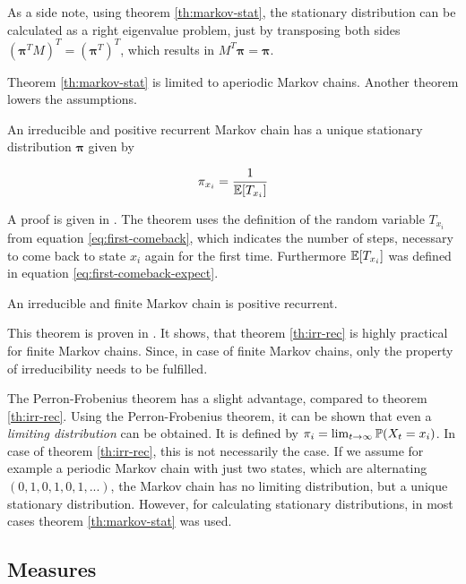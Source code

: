 As a side note, using theorem \ref{th:markov-stat}, the stationary distribution can be calculated as a right eigenvalue problem, just by transposing both sides $(\bm\pi^T M)^T = (\bm\pi^T)^T$, which results in $M^T \bm\pi = \bm\pi$.

Theorem \ref{th:markov-stat} is limited to aperiodic Markov chains. Another theorem lowers the assumptions.

\begin{theorem}
\label{th:irr-rec}
An irreducible and positive recurrent Markov chain has a unique stationary distribution $\bm\pi$ given by

\begin{equation}
\pi_{x_i} = \frac{1}{\mathbb{E}[T_{x_i}]}
\end{equation}
\end{theorem}

A proof is given in \textcite[Corollary 1.2.29]{bladt2017matrix}. The theorem uses the definition of the random variable $T_{x_i}$ from equation \eqref{eq:first-comeback}, which indicates the number of steps, necessary to come back to state $x_i$ again for the first time. Furthermore $\mathbb{E}[T_{x_i}]$ was defined in equation \eqref{eq:first-comeback-expect}.

\begin{theorem}
An irreducible and finite Markov chain is positive recurrent.
\end{theorem}

This theorem is proven in \textcite[Theorem 3.3]{bremaud2013markov}. It shows, that theorem \ref{th:irr-rec} is highly practical for finite Markov chains. Since, in case of finite Markov chains, only the property of irreducibility needs to be fulfilled.

The Perron-Frobenius theorem has a slight advantage, compared to theorem \ref{th:irr-rec}. Using the Perron-Frobenius theorem, it can be shown that even a \emph{limiting distribution} can be obtained. It is defined by $\pi_i = \lim_{t \to\infty} \mathbb{P}(X_t = x_i)$. In case of theorem \ref{th:irr-rec}, this is not necessarily the case. If we assume for example a periodic Markov chain with just two states, which are alternating $(0,1,0,1,0,1, ...)$, the Markov chain has no limiting distribution, but a unique stationary distribution. However, for calculating stationary distributions, in most cases theorem \ref{th:markov-stat} was used.

\subsection{Measures}
\label{sec:markov-measures}

